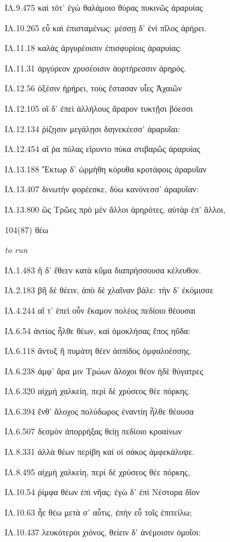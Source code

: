 \begin{enumerate}
{ΙΛ.9.475 καὶ τότ' ἐγὼ θαλάμοιο θύρας πυκινῶς ἀραρυίας

ΙΛ.10.265 εὖ καὶ ἐπισταμένως: μέσσῃ δ' ἐνὶ πῖλος ἀρήρει.

ΙΛ.11.18 καλὰς ἀργυρέοισιν ἐπισφυρίοις ἀραρυίας:

ΙΛ.11.31 ἀργύρεον χρυσέοισιν ἀορτήρεσσιν ἀρηρός.

ΙΛ.12.56 ὀξέσιν ἠρήρει, τοὺς ἕστασαν υἷες Ἀχαιῶν

ΙΛ.12.105 οἳ δ' ἐπεὶ ἀλλήλους ἄραρον τυκτῇσι βόεσσι

ΙΛ.12.134 ῥίζῃσιν μεγάλῃσι διηνεκέεσσ' ἀραρυῖαι:

ΙΛ.12.454 αἵ ῥα πύλας εἴρυντο πύκα στιβαρῶς ἀραρυίας

ΙΛ.13.188 Ἕκτωρ δ' ὡρμήθη κόρυθα κροτάφοις ἀραρυῖαν

ΙΛ.13.407 δινωτὴν φορέεσκε, δύω κανόνεσσ' ἀραρυῖαν:

ΙΛ.13.800 ὣς Τρῶες πρὸ μὲν ἄλλοι ἀρηρότες, αὐτὰρ ἐπ' ἄλλοι,

}

\clearpage
\item[\large 104(87)]{\large \g θέω}

\hspace{0.2cm} \textit{ to run  }

{\g
ΙΛ.1.483 ἣ δ' ἔθεεν κατὰ κῦμα διαπρήσσουσα κέλευθον.

ΙΛ.2.183 βῆ δὲ θέειν, ἀπὸ δὲ χλαῖναν βάλε: τὴν δ' ἐκόμισσε

ΙΛ.4.244 αἵ τ' ἐπεὶ οὖν ἔκαμον πολέος πεδίοιο θέουσαι

ΙΛ.6.54 ἀντίος ἦλθε θέων, καὶ ὁμοκλήσας ἔπος ηὔδα:

ΙΛ.6.118 ἄντυξ ἣ πυμάτη θέεν ἀσπίδος ὀμφαλοέσσης.

ΙΛ.6.238 ἀμφ' ἄρα μιν Τρώων ἄλοχοι θέον ἠδὲ θύγατρες

ΙΛ.6.320 αἰχμὴ χαλκείη, περὶ δὲ χρύσεος θέε πόρκης.

ΙΛ.6.394 ἔνθ' ἄλοχος πολύδωρος ἐναντίη ἦλθε θέουσα

ΙΛ.6.507 δεσμὸν ἀπορρήξας θείῃ πεδίοιο κροαίνων

ΙΛ.8.331 ἀλλὰ θέων περίβη καί οἱ σάκος ἀμφεκάλυψε.

ΙΛ.8.495 αἰχμὴ χαλκείη, περὶ δὲ χρύσεος θέε πόρκης,

ΙΛ.10.54 ῥίμφα θέων ἐπὶ νῆας: ἐγὼ δ' ἐπὶ Νέστορα δῖον

ΙΛ.10.63 ἦε θέω μετὰ σ' αὖτις, ἐπὴν εὖ τοῖς ἐπιτείλω;

ΙΛ.10.437 λευκότεροι χιόνος, θείειν δ' ἀνέμοισιν ὁμοῖοι:

}
\end{enumerate}
